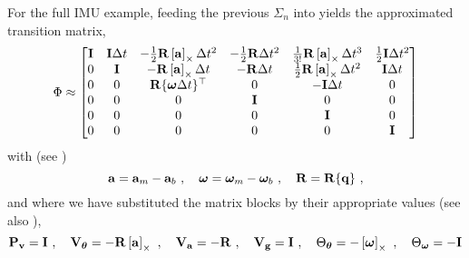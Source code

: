 For the full IMU example, feeding the previous $\Sigma_n$ into  yields the approximated transition matrix,
%
\begin{equation}
\Phi \approx \begin{bmatrix}
{\bf I} & {\bf I}\Delta t & -\frac{1}{2}{\bf R}\left[{\bf a}\right]_\times\Delta t^2 &  -\tfrac12{\bf R}\Delta t^2 & \frac{1}{3!}{\bf R}\left[{\bf a}\right]_\times\Delta t^3 & \tfrac12{\bf I}\Delta t^2 \\
0 & {\bf I} & -{\bf R}\left[{\bf a}\right]_\times\Delta t &  -{\bf R}\Delta t & \frac{1}{2}{\bf R}\left[{\bf a}\right]_\times\Delta t^2 & {\bf I}\Delta t \\
0 & 0 & {\bf R}\{{\bm \omega}\Delta t\}^{\top} &  0 & -{\bf I}\Delta t & 0 \\
0 & 0 & 0 & {\bf I} & 0 & 0 \\
0 & 0 & 0 & 0 & {\bf I} & 0 \\
0 & 0 & 0 & 0 & 0 & {\bf I} \\
\end{bmatrix}\label{equ:FullIMU_PhiTrunc}
\end{equation}
%
with (see )
%
\begin{equation*}
{\bf a}={\bf a}_m-{\bf a}_b~,\quad{\bm \omega}={\bm \omega}_m-{\bm \omega}_b~,\quad{\bf R}={\bf R}\{{\bf q}\}~,
\end{equation*}
%
and where we have substituted the matrix blocks by their appropriate values (see also ),
%
\begin{equation*}
{\bf P}_{\bf v}={\bf I}~, \quad 
{\bf V}_{\bm \theta}=-{\bf R}\left[{\bf a}\right]_\times~, \quad 
{\bf V}_{\bf a}=-{\bf R}~, \quad
{\bf V}_{\bf g}={\bf I}~, \quad
\Theta_{\bm \theta}=-\left[{\bm \omega}\right]_\times~, \quad
\Theta_{\bm \omega}=-{\bf I} 
\end{equation*}

